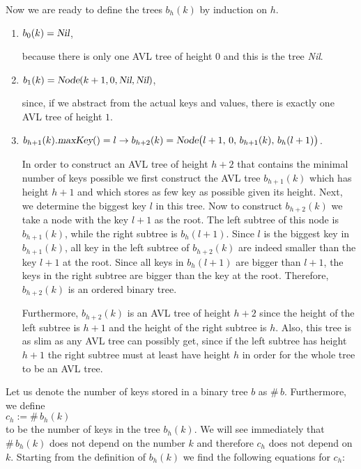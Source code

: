 Now we are ready to define the trees  $b_h(k)$ by induction on  $h$.
\begin{enumerate}
\item $b_0(k) = \textsl{Nil}$,

      because there is only one AVL tree of height $0$ and this is the tree \textsl{Nil}.
\item $b_1(k) = \textsl{Node}(k+1,0,\textsl{Nil}, \textsl{Nil})$,

      since, if we abstract from the actual keys and values, there is exactly one AVL tree of height
      $1$.
\item $b_{h+1}(k).\textsl{maxKey}() = l \rightarrow 
       b_{h+2}(k) = \textsl{Node}\bigl(l+1,\,0,\,b_{h+1}(k),\,b_h(l+1)\bigr)$.

      In order to construct an AVL tree of height $h+2$ that contains the minimal number of keys 
      possible we first construct the AVL tree $b_{h+1}(k)$ which has height  $h+1$ and which stores as few
      key as possible given its height.  Next, we determine the biggest key $l$ in this tree. 
      Now to construct $b_{h+2}(k)$ we take a node with the key $l+1$ as the root.
      The left subtree of this node is $b_{h+1}(k)$, while the right subtree is $b_h(l+1)$.
      Since $l$ is the biggest key in $b_{h+1}(k)$, all key in the left subtree of
      $b_{h+2}(k)$ are indeed smaller than the key $l+1$ at the root.  Since all keys in
      $b_h(l+1)$ are bigger than $l+1$, the keys in the right subtree are bigger than the key at the
      root.  Therefore, $b_{h+2}(k)$ is an ordered binary tree.

      Furthermore, $b_{h+2}(k)$ is an AVL tree of height $h+2$ since the height of the left subtree
      is $h+1$ and the height of the right subtree is $h$.  Also, this tree is as slim as
      any AVL tree can possibly get, since if the left subtree has height $h+1$ the right subtree
      must at least have height $h$ in order for the whole tree to be an AVL tree.
\end{enumerate}
Let us denote the number of keys stored in a binary tree $b$ as  $\#\,b$.  Furthermore, we define
\\[0.2cm]
\hspace*{1.3cm}
$c_h := \#\, b_h(k)$
\\[0.2cm]
to be the number of keys in the tree $b_h(k)$.  We will see immediately that 
$\#\,b_h(k)$ does not depend on the number $k$ and therefore $c_h$ does not depend on $k$.  Starting
from the definition of $b_h(k)$ we find the following equations for $c_h$:
